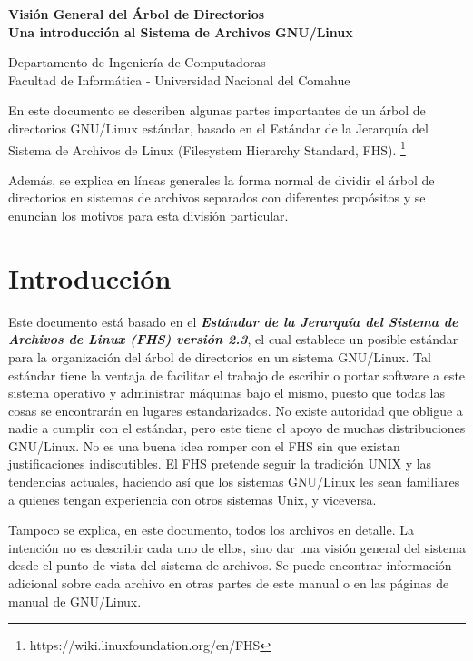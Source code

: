 \documentclass[12pt]{article}
\def\maketitle{

 \makeatletter
 {\color{bl} \centering \huge \sc \textbf{
Visión General del Árbol de Directorios \\
\large \vspace*{-8pt} \color{black} Una introducción al Sistema de Archivos GNU/Linux
 \vspace*{8pt} }\par}
 \makeatother


 \makeatletter
 {\centering \small 
 	Departamento de Ingeniería de Computadoras \\
 	Facultad de Informática - Universidad Nacional del Comahue \\
 	\vspace{20pt} }
 \makeatother

}
\begin{document}
\thispagestyle{empty}
\maketitle
\setlength{\parindent}{0pt}

En este documento se describen algunas partes importantes de un árbol de
directorios GNU/Linux estándar, basado en el Estándar de la Jerarquía del
Sistema de Archivos de Linux (Filesystem Hierarchy Standard, FHS).
\footnote{https://wiki.linuxfoundation.org/en/FHS} 

Además, se explica en líneas generales la forma normal de dividir el árbol de directorios
en sistemas de archivos separados con diferentes propósitos y se enuncian los
motivos para esta división particular. 

\section{ Introducción}
Este documento está basado en el \textbf{\textit{Estándar de la Jerarquía del
Sistema de Archivos de Linux (FHS) versión 2.3}}, el cual 
establece un posible estándar para la organización del árbol de directorios en un
sistema GNU/Linux. Tal estándar tiene la ventaja de facilitar el trabajo de
escribir o portar software a este sistema operativo y administrar máquinas bajo
el mismo, puesto que todas las cosas se encontrarán en lugares estandarizados.
No existe autoridad que obligue a nadie a cumplir con el estándar, pero este
tiene el apoyo de muchas distribuciones GNU/Linux. No es una buena idea romper
con el FHS sin que existan justificaciones indiscutibles. El FHS pretende seguir
la tradición UNIX y las tendencias actuales, haciendo así que los sistemas
GNU/Linux les sean familiares a quienes tengan experiencia con otros sistemas
Unix, y viceversa.  


Tampoco se explica, en este documento, todos los archivos en detalle. La
intención no es describir cada uno de ellos, sino dar una visión general del
sistema desde el punto de vista del sistema de archivos.  Se puede encontrar
información adicional sobre cada archivo en otras partes de este manual o en las
páginas de manual de GNU/Linux.  
\end{document}
